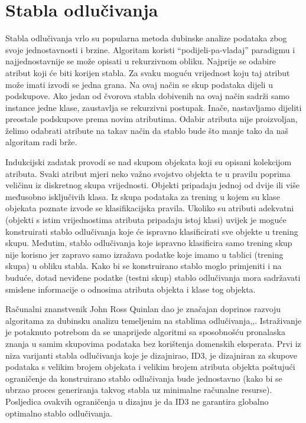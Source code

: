\section{Stabla odlučivanja}
\label{ch:ch3}

Stabla odlučivanja vrlo su popularna metoda dubinske analize podataka zbog svoje jednostavnosti i brzine. Algoritam koristi “podijeli-pa-vladaj” paradigmu i najjednostavnije se može opisati u rekurzivnom obliku. Najprije se odabire atribut koji će biti korijen stabla. Za svaku moguću vrijednost koju taj atribut može imati izvodi se jedna grana. Na ovaj način se skup podataka dijeli u podskupove. Ako jedan od čvorova stabla dobivenih na ovaj način sadrži samo instance jedne klase, zaustavlja se rekurzivni postupak. Inače, nastavljamo dijeliti preostale podskupove prema novim atributima. Odabir atributa nije proizvoljan, želimo odabrati atribute na takav način da stablo bude što manje tako da naš algoritam radi brže. 

Indukcijski zadatak provodi se nad skupom objekata koji su opisani kolekcijom atributa. Svaki atribut mjeri neko važno svojstvo objekta te u pravilu poprima veličinu iz diskretnog skupa vrijednosti. Objekti pripadaju jednoj od dvije ili više međusobno isključivih klasa. Iz skupa podataka za trening u kojem su klase objekata poznate izvode se klasifikacijska pravila. Ukoliko su atributi adekvatni (objekti s istim vrijednostima atributa pripadaju istoj klasi) uvijek je moguće konstruirati stablo odlučivanja koje će ispravno klasificirati sve objekte u trening skupu\cite{Witten01}. 
Međutim, stablo odlučivanja koje ispravno klasificira samo trening skup nije korisno jer zapravo samo izražava podatke koje imamo u tablici (trening skupa) u obliku stabla. Kako bi se  konstruirano stablo moglo primjeniti i na buduće, dotad neviđene podatke (testni skup) stablo odlučivanja mora sadržavati smislene informacije o odnosima atributa objekta i klase tog objekta. 

Računalni znanstvenik John Ross Quinlan dao je značajan doprinos razvoju algoritama za dubinsku analizu temeljenim na stablima odlučivanja\cite{Quinlan01},\cite{Quinlan02},\cite{Wu01}. Istraživanje je potaknuto potrebom da se unaprijede algoritmi sa sposobnošću pronalaska znanja u samim skupovima podataka bez korištenja domenskih eksperata. Prvi iz niza varijanti stabla odlučivanja koje je dizajnirao, ID3, je dizajniran za skupove podataka s velikim brojem objekata i velikim brojem atributa objekta poštujući ograničenje da konstruirano stablo odlučivanja bude jednostavno (kako bi se ubrzao proces generiranja takvog stabla uz minimalne računalne resurse). Posljedica ovakvih ograničenja u dizajnu je da ID3 ne garantira globalno optimalno stablo odlučivanja\cite{Quinlan02}.

